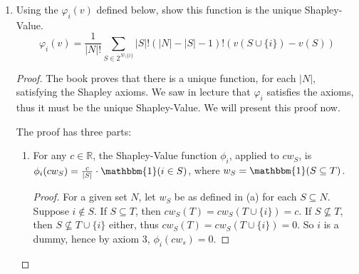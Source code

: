 \documentclass[10pt]{article}
\newcommand{\R}{\mathbb{R}}
\begin{document}
\begin{enumerate}
\begin{proof}
I assume that $\varphi_i$ refers to the function in exercise 3, rather than to an arbitrary function satisfying the Shapley axioms (although these turn out to be equivalent).  Still, there exist additive functions that are not $\R$-linear, so the most sensible method of proof is to use the result of exercise 3 to assert that $\varphi_i$ is the only function satisfying the axioms, then show that $\varphi_i$ is linear, proving that any function satisfying these axioms is linear.
\begin{align*}
\varphi_i \left( \sum_{j=1}^k c_j v_j \right) &= \frac{1}{|N|!} \sum_{S \in 2^{N \setminus \{i\}}} |S|!(|N| - |S| - 1)! \left( \sum_{j=1}^k c_j v_j(S \cup \{i\}) - \sum_{j=1}^k c_j v_j(S) \right)
\\
&= \frac{1}{|N|!} \sum_{S \in 2^{N \setminus \{i\}}} |S|!(|N| - |S| - 1)! \sum_{j=1}^k c_j \left(v_j(S \cup \{i\}) - v_j(S) \right)
\\
&= \frac{1}{|N|!} \sum_{S \in 2^{N \setminus \{i\}}} \sum_{j=1}^k c_j |S|!(|N| - |S| - 1)! \left(v_j(S \cup \{i\}) - v_j(S) \right)
\\
&= \sum_{j=1}^k c_j \frac{1}{|N|!} \sum_{S \in 2^{N \setminus \{i\}}} |S|!(|N| - |S| - 1)! \left(v_j(S \cup \{i\}) - v_j(S) \right)
\\
&= \sum_{j=1}^k c_j \varphi_i( v_j).
\end{align*}
Switching the summations is justified simply by the fact that the domains of the summations are constant with respect to each other.
\end{proof}

\item Using the $\varphi_i(v)$ defined below, show this function is the unique Shapley-Value.
$$
\varphi_i(v) = \frac{1}{|N|!} \sum_{S \in 2^{N \setminus \{i\}}} |S|!(|N| - |S| - 1)!(v(S \cup \{i\}) - v(S))
$$

\begin{proof}

The book proves that there is a unique function, for each $|N|$, satisfying the Shapley axioms.  We saw in lecture that $\varphi_i$ satisfies the axioms, thus it must be the unique Shapley-Value.  We will present this proof now.

The proof has three parts:
\begin{enumerate}
\item For any $c \in \R$, the Shapley-Value function $\phi_i$, applied to $cw_S$, is $\phi_i(cw_S) = \frac{c}{|S|}\cdot \mathbbm{1}(i \in S)$, where $w_S = \mathbbm{1}(S \subseteq{T})$.
\begin{proof}
For a given set $N$, let $w_S$ be as defined in (a) for each $S \subseteq N$.  Suppose $i \not \in S$.  If $S \subseteq T$, then $cw_S(T) = cw_S(T \cup \{i\}) = c$.  If $S \not \subseteq T$, then $S \not \subseteq T \cup \{i\}$ either, thus $cw_S(T) = cw_S(T \cup \{i\}) = 0$.  So $i$ is a dummy, hence by axiom 3, $\phi_i(cw_s) = 0$.


\end{proof}
\end{enumerate}
\end{proof}
\end{enumerate}
\end{document}
